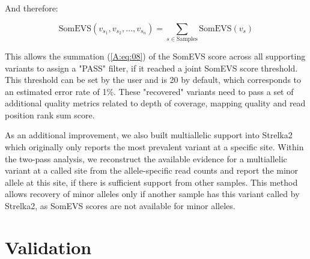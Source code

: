 And therefore:

\begin{equation}
\text{SomEVS}(v_{s_1},v_{s_2},\ldots,v_{s_n}) = \sum_{s \in \text{Samples}} \text{SomEVS}(v_{s}) \label{A:eq:08}
\end{equation}

This allows the summation (\autoref{A:eq:08}) of the SomEVS score across all supporting variants to assign a "PASS" filter, if it reached a joint SomEVS score threshold. This threshold can be set by the user and is 20 by default, which corresponds to an estimated error rate of 1\%. These "recovered" variants need to pass a set of additional quality metrics related to depth of coverage, mapping quality and read position rank sum score.

As an additional improvement, we also built multiallelic support into Strelka2 which originally only reports the most prevalent variant at a specific site. Within the two-pass analysis, we reconstruct the available evidence for a multiallelic variant at a called site from the allele-specific read counts and report the minor allele at this site, if there is sufficient support from other samples. This method allows recovery of minor alleles only if another sample has this variant called by Strelka2, as SomEVS scores are not available for minor alleles.

\section{Validation}


